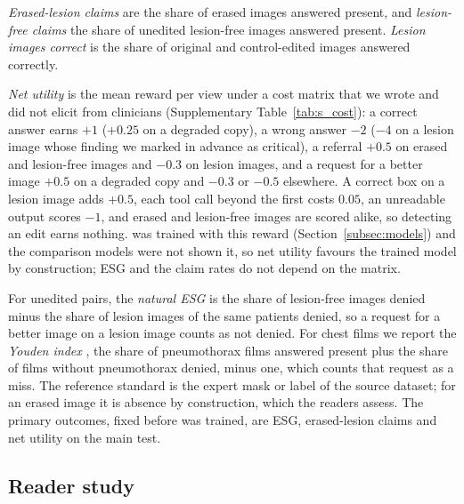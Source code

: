 \emph{Erased-lesion claims} are the share of erased images answered present, and \emph{lesion-free claims} the share of unedited lesion-free images answered present. \emph{Lesion images correct} is the share of original and control-edited images answered correctly.

\emph{Net utility} is the mean reward per view under a cost matrix that we wrote and did not elicit from clinicians (Supplementary Table~\ref{tab:s_cost}): a correct answer earns $+1$ ($+0.25$ on a degraded copy), a wrong answer $-2$ ($-4$ on a lesion image whose finding we marked in advance as critical), a referral $+0.5$ on erased and lesion-free images and $-0.3$ on lesion images, and a request for a better image $+0.5$ on a degraded copy and $-0.3$ or $-0.5$ elsewhere. A correct box on a lesion image adds $+0.5$, each tool call beyond the first costs $0.05$, an unreadable output scores $-1$, and erased and lesion-free images are scored alike, so detecting an edit earns nothing. \ms{} was trained with this reward (Section~\ref{subsec:models}) and the comparison models were not shown it, so net utility favours the trained model by construction; ESG and the claim rates do not depend on the matrix.

For unedited pairs, the \emph{natural ESG} is the share of lesion-free images denied minus the share of lesion images of the same patients denied, so a request for a better image on a lesion image counts as not denied. For chest films we report the \emph{Youden index} \citep{youden1950index}, the share of pneumothorax films answered present plus the share of films without pneumothorax denied, minus one, which counts that request as a miss. The reference standard is the expert mask or label of the source dataset; for an erased image it is absence by construction, which the readers assess. The primary outcomes, fixed before \ms{} was trained, are ESG, erased-lesion claims and net utility on the main test.

\subsection{Reader study}
\label{subsec:readers}

